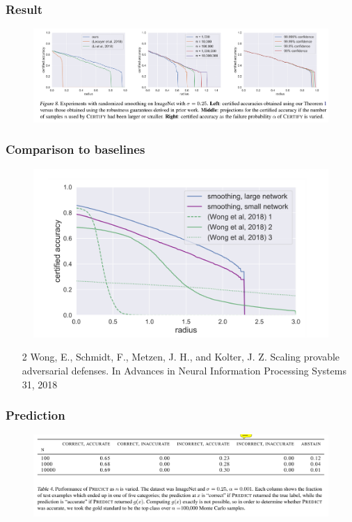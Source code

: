 \documentclass[aspectratio=169%
,serif,mathserif]{beamer}
\begin{document}
\begin{frame}
	\frametitle{Result}
	\begin{figure}[htbp]
		\includegraphics[width=1\linewidth]{17.png}
	\end{figure}
\end{frame}


\begin{frame}
	\frametitle{Comparison to baselines}
	\begin{figure}[htbp]
		\includegraphics[width=.5\linewidth]{18.png}
	\end{figure}

	\begin{itemize}
		\item [2]Wong, E., Schmidt, F., Metzen, J. H., and Kolter, J. Z. Scaling provable 
		adversarial defenses. In Advances in Neural Information Processing Systems 31, 2018
	\end{itemize}
	

\end{frame}

\begin{frame}
	\frametitle{Prediction}
	\begin{figure}[htbp]
		\includegraphics[width=1\linewidth]{19.png}
	\end{figure}
\end{frame}
\end{document}
